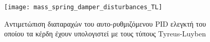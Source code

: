 \begin{figure}[h]
  \centering
  \texttt{[image: mass\_spring\_damper\_disturbances\_TL]}
  \caption{Αντιμετώπιση διαταραχών του αυτο-ρυθμιζόμενου PID ελεγκτή του οποίου τα κέρδη έχουν υπολογιστεί με τους τύπους Tyreus-Luyben}
  \label{fig:mass_spring_damper_disturbances_TL}
\end{figure}



















